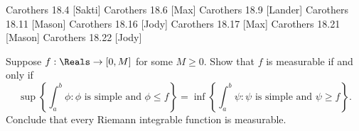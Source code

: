 \documentclass[minion]{homework}
\begin{document}
\begin{aproblems}


\hproblem Carothers 18.4 [Sakti]
\hproblem Carothers 18.6 [Max]
\hproblem Carothers 18.9 [Lander]
\hproblem Carothers 18.11 [Mason]
\hproblem Carothers 18.16 [Jody]
\hproblem Carothers 18.17 [Max]
\hproblem Carothers 18.21 [Mason]
\hproblem Carothers 18.22 [Jody]
\hproblem [Lander]

Suppose $f:\Reals\rightarrow[0,M]$ for some $M\ge 0$.
Show that $f$ is measurable if and only if 
\[
\sup\left\{ \int_a^b \phi : \text{$\phi$ is simple and $\phi\le f$}\right\} =
\inf\left\{ \int_a^b \psi : \text{$\psi$ is simple and $\psi\ge f$}\right\}.
\]
Conclude that every Riemann integrable function is measurable.



\end{aproblems}
\end{document}
